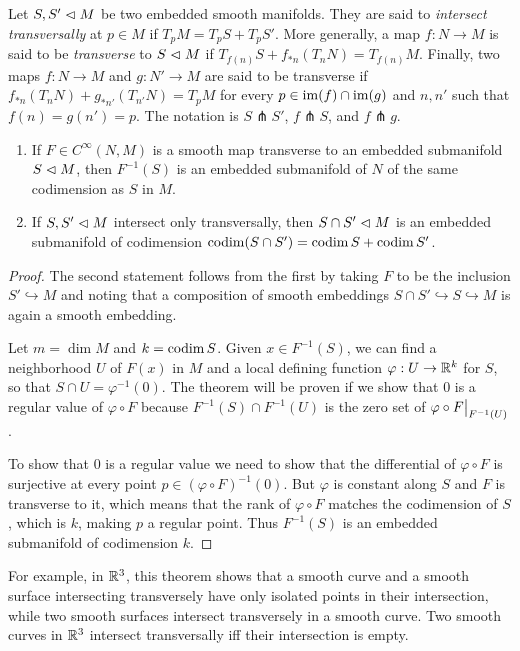 \begin{defn}[Transversality]
Let $S,S'\vartriangleleft M$ be two embedded smooth manifolds. They are said to \emph{intersect transversally} at $p\in M$ if $T_p M=T_p S+ T_p S'$. More generally, a map $f:N\to M$ is said to be \emph{transverse} to $S\vartriangleleft M$ if $T_{f(n)}S+f_{\ast n}(T_n N)=T_{f(n)}M$. Finally, two maps $f:N\to M$ and $g:N'\to M$ are said to be transverse if $f_{\ast n}(T_nN)+g_{\ast n'}(T_{n'}N)=T_p M$ for every $p\in\operatorname{im}(f)\cap\operatorname{im}(g)$ and $n,n'$ such that $f(n)=g(n')=p$. The notation is $S\pitchfork S'$, $f\pitchfork S$, and $f\pitchfork g$.
\end{defn}
\begin{thm}\label{thm 6.30 Lee}
\begin{enumerate}
    \item If $F\in C^\infty(N,M)$ is a smooth map transverse to an embedded submanifold $S\vartriangleleft M$, then $F^{-1}(S)$ is an embedded submanifold of $N$ of the same codimension as $S$ in $M$.
    \item If $S,S'\vartriangleleft M$ intersect only transversally, then $S\cap S'\vartriangleleft M$ is an embedded submanifold of codimension  $\operatorname{codim}(S\cap S')=\operatorname{codim} S+\operatorname{codim} S'$.
\end{enumerate}
\end{thm}
\begin{proof}
The second statement follows from the first by taking $F$ to be the inclusion $S'\hookrightarrow M$ and noting that a composition of smooth embeddings $S\cap S'\hookrightarrow S\hookrightarrow M$ is again a smooth embedding.

Let $m=\dim M$ and $k=\operatorname{codim} S$. Given $x\in F^{-1}(S)$, we can find a neighborhood $U$ of $F(x)$ in $M$ and a local defining function $\varphi:U\to \mathbb{R}^k$ for $S$, so that $S\cap U=\varphi^{-1}(0)$. The theorem will be proven if we show that $0$ is a regular value of $\varphi\circ F$ because $F^{-1}(S)\cap F^{-1}(U)$ is the zero set of $\varphi\circ \restr{F}{F^{-1}(U)}$.

To show that $0$ is a regular value we need to show that the differential of $\varphi\circ F$ is surjective at every point $p\in (\varphi\circ F)^{-1}(0)$. But $\varphi$ is constant along $S$ and $F$ is transverse to it, which means that the rank of $\varphi\circ F$ matches the codimension of $S$, which is $k$, making $p$ a regular point. Thus $F^{-1}(S)$ is an embedded submanifold of codimension $k$.
\end{proof}

For example, in $\mathbb{R}^3$, this theorem shows that a smooth curve and a smooth surface intersecting transversely have only isolated points in their intersection, while two smooth surfaces intersect transversely in a smooth curve. Two smooth curves in $\mathbb{R}^3$ intersect transversally iff their intersection is empty.

